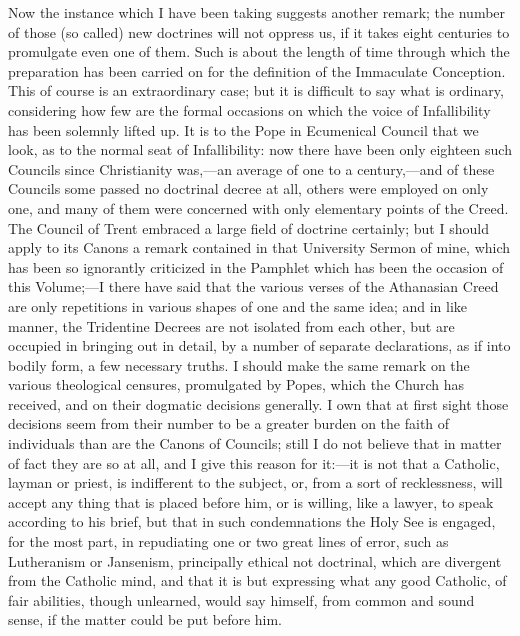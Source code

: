 Now the instance which I have been taking suggests another remark;
the number of those (so called) new doctrines will not oppress us, if it
takes eight centuries to promulgate even one of them. Such is about the
length of time through which the preparation has been carried on for the
definition of the Immaculate Conception. This of course is an
extraordinary case; but it is difficult to say what is ordinary,
considering how few are the formal occasions on which the voice of
Infallibility has been solemnly lifted up. It is to the Pope in
Ecumenical Council that we look, as to the normal seat of Infallibility:
now there have been only eighteen such Councils since Christianity was,—an
average of one to a century,—and of these Councils some passed no
doctrinal decree at all, others were employed on only one, and many of
them were concerned with only elementary points of the Creed. The
Council of Trent embraced a large field of doctrine certainly; but I
should apply to its Canons a remark contained in that University Sermon
of mine, which has been so ignorantly criticized in the Pamphlet which
has been the occasion of this Volume;—I there have said that the various
verses of the Athanasian Creed are only repetitions in various shapes of
one and the same idea; and in like manner, the Tridentine Decrees are
not isolated from each other, but are occupied in bringing out in
detail, by a number of separate declarations, as if into bodily form, a
few necessary truths. I should make the same remark on the various theological censures, promulgated by
Popes, which the Church has received, and on their dogmatic decisions
generally. I own that at first sight those decisions
seem from their number to be a greater burden on the faith of
individuals than are the Canons of Councils; still I do not believe that in matter of fact they are so at all, and I give
this reason for it:—it is not that a Catholic, layman or priest, is
indifferent to the subject, or, from a sort of recklessness, will accept
any thing that is placed before him, or is willing, like a lawyer, to
speak according to his brief, but that in such condemnations the Holy
See is engaged, for the most part, in repudiating one or two great lines
of error, such as Lutheranism or Jansenism, principally ethical not
doctrinal, which are divergent from the Catholic mind, and that it
is but expressing what any good Catholic, of fair abilities,
though unlearned, would say himself, from common and sound sense, if the
matter could be put before him.

